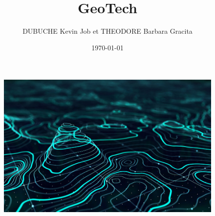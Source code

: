 \documentclass[a4paper,12pt]{report}
\begin{document}
\begin{figure}[t]
        \centering
        \includegraphics[width=1\textwidth]{GIS}
        \label{image-GIS}
        \end{figure}

\title{GeoTech}
\author{DUBUCHE Kevin Job et THEODORE Barbara Gracita}
\date{\today}
\maketitle

\tableofcontents
\newpage
{}
























\chapter{}












\end{document}

